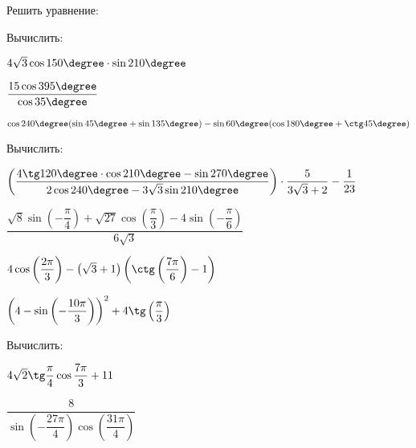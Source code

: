\begin{listofex}
	\item Решить уравнение:
	\begin{enumcols}[itemcolumns=2]
		\item {}
		\item {}
		\item {}
		\item {}
		\item {}
		\item {}
		\item {}
	\end{enumcols}
	\item Вычислить:
	\begin{enumcols}[itemcolumns=1]
		\item \( 4\sqrt{3}\cos150\degree\cdot\sin210\degree \) 
		\item \( \dfrac{15\cos395\degree}{\cos35\degree} \)
		\item \( \cos240\degree(\sin45\degree+\sin135\degree)-\sin60\degree(\cos180\degree+\ctg45\degree) \)
	\end{enumcols}
	\item Вычислить:
	\begin{enumcols}[itemcolumns=1]
		\item \( \left( \dfrac{4\tg120\degree\cdot\cos210\degree-\sin270\degree}{2\cos240\degree-3\sqrt{3}\sin210\degree} \right)\cdot\dfrac{5}{3\sqrt{3}+2}-\dfrac{1}{23} \)
		\item \( \dfrac{\sqrt{8}\sin\left( -\dfrac{\pi}{4} \right)+\sqrt{27}\cos\left( \dfrac{\pi}{3} \right)-4\sin\left( -\dfrac{\pi}{6} \right)}{6\sqrt{3}} \) 
		\item \( 4\cos\left( \dfrac{2\pi}{3} \right)-\left( \sqrt{3}+1 \right)\left( \ctg\left( \dfrac{7\pi}{6} \right)-1 \right) \) 
		\item \( \left( 4 - \sin\left( -\dfrac{10\pi}{3} \right) \right)^2+4\tg\left( \dfrac{\pi}{3} \right) \) 
	\end{enumcols}
	\item Вычислить:
	\begin{enumcols}[itemcolumns=2]
		\item \( 4\sqrt{2}\tg\dfrac{\pi}{4}\cos\dfrac{7\pi}{3}+11 \)
		\item \( \dfrac{8}{\sin\left( -\dfrac{27\pi}{4}\right)\cos\left( \dfrac{31\pi}{4} \right) } \)
	\end{enumcols}

\end{listofex}
